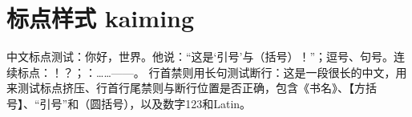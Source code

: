 \documentclass[a4paper,10pt,UTF8,scheme=chinese]{ctexart}
\begin{document}
\section{标点样式 kaiming}
中文标点测试：你好，世界。他说：“这是‘引号’与（括号）！”；逗号、句号。连续标点：！？；：……——。
行首禁则用长句测试断行：这是一段很长的中文，用来测试标点挤压、行首行尾禁则与断行位置是否正确，包含《书名》、【方括号】、“引号”和（圆括号），以及数字123和Latin。
\end{document}
